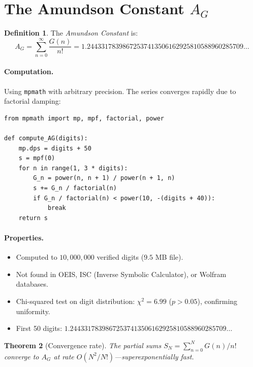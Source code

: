 \documentclass[11pt,a4paper]{article}
\newtheorem{theorem}{Theorem}[section]
\theoremstyle{definition}
\newtheorem{definition}[theorem]{Definition}
\theoremstyle{remark}
\newcommand{\AG}{A_G}
\begin{document}
\section{The Amundson Constant \texorpdfstring{$\AG$}{A\_G}}\label{sec:constant}

\begin{definition}\label{def:AG}
The \emph{Amundson Constant} is:
\begin{equation}\label{eq:AG}
  \AG = \sum_{n=0}^{\infty}\frac{G(n)}{n!} = 1.24433178398672537413506162925810588960285709\ldots
\end{equation}
\end{definition}

\paragraph{Computation.}
Using \texttt{mpmath} with arbitrary precision. The series converges rapidly due to factorial damping:
\begin{verbatim}
from mpmath import mp, mpf, factorial, power

def compute_AG(digits):
    mp.dps = digits + 50
    s = mpf(0)
    for n in range(1, 3 * digits):
        G_n = power(n, n + 1) / power(n + 1, n)
        s += G_n / factorial(n)
        if G_n / factorial(n) < power(10, -(digits + 40)):
            break
    return s
\end{verbatim}

\paragraph{Properties.}
\begin{itemize}
  \item Computed to $10{,}000{,}000$ verified digits ($9.5$ MB file).
  \item Not found in OEIS, ISC (Inverse Symbolic Calculator), or Wolfram databases.
  \item Chi-squared test on digit distribution: $\chi^{2}=6.99$ ($p>0.05$), confirming uniformity.
  \item First 50 digits: $1.24433178398672537413506162925810588960285709\ldots$
\end{itemize}

\begin{theorem}[Convergence rate]\label{thm:convrate}
The partial sums $S_{N}=\sum_{n=0}^{N}G(n)/n!$ converge to $\AG$ at rate $O(N^{2}/N!)$---superexponentially fast.
\end{theorem}
\end{document}
